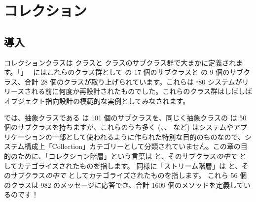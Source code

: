\documentclass[a4paper,10pt,twoside]{book}
\begin{document}
	\sloppy
\fi
\chapter{コレクション}

\section{導入}

コレクションクラスは  クラスと  クラスのサブクラス群で大まかに定義されます。「」~\cite{Gold83a} にはこれらのクラス群として  の 17 個のサブクラスと   の 9 個のサブクラス、合計 28 個のクラスが取り上げられています。これらは \st-80 システムがリリースされる前に何度か再設計されたものでした。これらのクラス群はしばしばオブジェクト指向設計の模範的な実例としてみなされます。

\pharo では、抽象クラスである は 101 個のサブクラスを、同じく抽象クラスの  は 50 個のサブクラスを持ちますが、これらのうち多く (\mbox{、}\mbox{、} など) はシステムやアプリケーションの一部として使われるように作られた特別な目的のものなので、システム構成上「Collection」カテゴリーとして分類されていません。この章の目的のために、「コレクション階層」という言葉は  と、そのサブクラス\emph{の中で}  としてカテゴライズされたものを指します。
同様に「ストリーム階層」は  と、そのサブクラス\emph{の中で}  としてカテゴライズされたものを指します。
これら 56 個のクラスは 982 のメッセージに応答でき、合計 1609 個のメソッドを定義しているのです！


\end{document}

